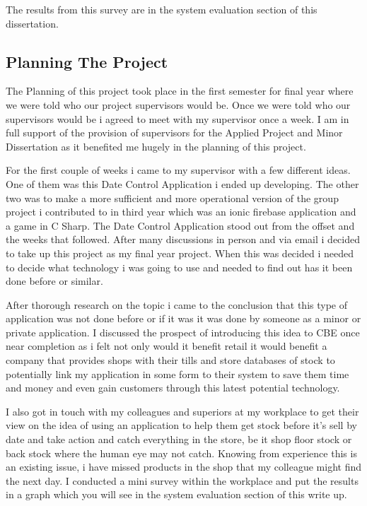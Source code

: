 The results from this survey are in the system evaluation section of this dissertation. 

\subsection{Planning The Project}
The Planning of this project took place in the first semester for final year where we were told who our project supervisors would be. Once we were told who our supervisors would be i agreed to meet with my supervisor once a week. I am in full support of the provision of supervisors for the Applied Project and Minor Dissertation as it benefited me hugely in the planning of this project. 
\newline

For the first couple of weeks i came to my supervisor with a few different ideas. One of them was this Date Control Application i ended up developing. The other two was to make a more sufficient and more operational version of the group project i contributed to in third year which was an ionic firebase application and a game in C Sharp. The Date Control Application stood out from the offset and the weeks that followed. After many discussions in person and via email i decided to take up this project as my final year project. When this was decided i needed to decide what technology i was going to use and needed to find out has it been done before or similar. 
\newline

After thorough research on the topic i came to the conclusion that this type of application was not done before or if it was it was done by someone as a minor or private application. I discussed the prospect of introducing this idea to CBE once near completion as i felt not only would it benefit retail it would benefit a company that provides shops with their tills and store databases of stock to potentially link my application in some form to their system to save them time and money and even gain customers through this latest potential technology. 
\newline

I also got in touch with my colleagues and superiors at my workplace to get their view on the idea of using an application to help them get stock before it's sell by date and take action and catch everything in the store, be it shop floor stock or back stock where the human eye may not catch. Knowing from experience this is an existing issue, i have missed products in the shop that my colleague might find the next day. I conducted a mini survey within the workplace and put the results in a graph which you will see in the system evaluation section of this write up. 
\newline

